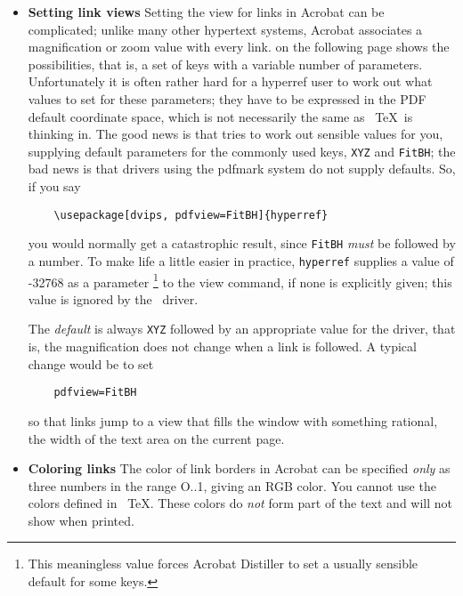  
\begin{itemize}
  \item \textbf{Setting link views} Setting the view for links in Acrobat can be complicated; 
    unlike many other hypertext systems, Acrobat associates a magnification or zoom 
    value with every link.  on the following page shows the possibilities, that is, 
    a set of keys with a variable number of parameters. Unfortunately it is often rather 
    hard for a hyperref user to work out what values to set for these parameters; they 
    have to be expressed in the PDF default coordinate space, which is not necessarily 
    the same as \ \TeX\  is thinking in. The good news is that \pdfTEX tries to work out 
    sensible values for you, supplying default parameters for the commonly used keys, 
    \verb|XYZ| and \verb|FitBH|; the bad news is that drivers using the pdfmark system do not supply 
    defaults. So, if you say 

    \begin{verbatim}
    \usepackage[dvips, pdfview=FitBH]{hyperref} 
    \end{verbatim}

    you would normally get a catastrophic result, since \verb|FitBH|
    \emph{must} be followed by a number. To make life a little easier in
    practice, \verb|hyperref| supplies a value of -32768 as a parameter \footnote{
    This meaningless value forces Acrobat Distiller to set a usually
    sensible default for some keys.}
    to the view command, if none is explicitly given; this value is ignored
    by the \pdfTEX\  driver. 

    The \emph{default} is always \verb|XYZ| followed by an appropriate value
    for the driver, that is, the magnification does not change when a link
    is followed. A typical change would be to set 

    \begin{verbatim}
    pdfview=FitBH 
    \end{verbatim}

    so that links jump to a view that fills the window with something rational, the width 
    of the text area on the current page. 

  \item \textbf{Coloring links} The color of link borders in Acrobat can
    be specified \emph{only} as three numbers in the range O..1, giving an
    RGB color. You cannot use the colors defined in \ \TeX. These colors
    do \emph{not} form part of the text and will not show when printed. 


\end{itemize}
